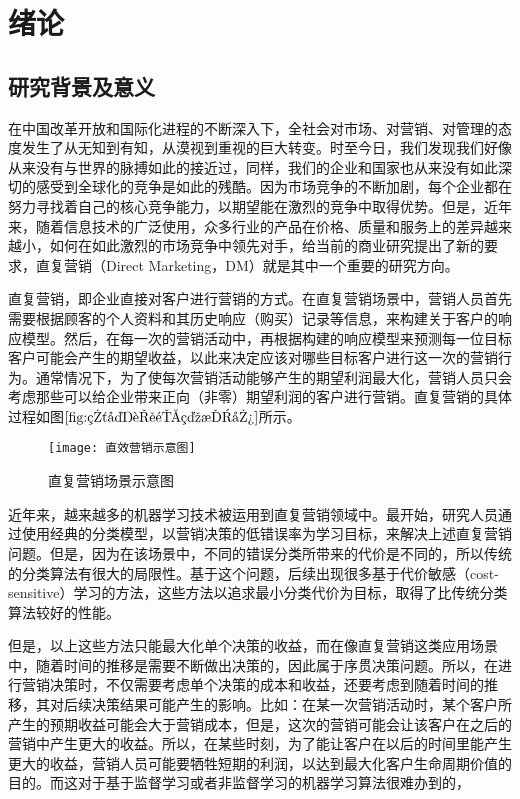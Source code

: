 \chapter{绪论}
 

 \section{研究背景及意义}
 在中国改革开放和国际化进程的不断深入下，全社会对市场、对营销、对管理的态度发生了从无知到有知，从漠视到重视的巨大转变。时至今日，我们发现我们好像从来没有与世界的脉搏如此的接近过，同样，我们的企业和国家也从来没有如此深切的感受到全球化的竞争是如此的残酷。因为市场竞争的不断加剧，每个企业都在努力寻找着自己的核心竞争能力，以期望能在激烈的竞争中取得优势。但是，近年来，随着信息技术的广泛使用，众多行业的产品在价格、质量和服务上的差异越来越小，如何在如此激烈的市场竞争中领先对手，给当前的商业研究提出了新的要求，直复营销（Direct Marketing，DM）就是其中一个重要的研究方向。

 直复营销，即企业直接对客户进行营销的方式。在直复营销场景中，营销人员首先需要根据顾客的个人资料和其历史响应（购买）记录等信息，来构建关于客户的响应模型。然后，在每一次的营销活动中，再根据构建的响应模型来预测每一位目标客户可能会产生的期望收益，以此来决定应该对哪些目标客户进行这一次的营销行为。通常情况下，为了使每次营销活动能够产生的期望利润最大化，营销人员只会考虑那些可以给企业带来正向（非零）期望利润的客户进行营销\citep{王广宇2013客户关系管理}。直复营销的具体过程如图$\ref{fig:直复营销示意图}$所示。
	\begin{figure}[htbp]
	\centering
	\texttt{[image: 直效营销示意图]}
	\caption{直复营销场景示意图}
	\label{fig:直复营销示意图}
	\end{figure}

近年来，越来越多的机器学习技术被运用到直复营销领域中。最开始，研究人员通过使用经典的分类模型，以营销决策的低错误率为学习目标，来解决上述直复营销问题。但是，因为在该场景中，不同的错误分类所带来的代价是不同的，所以传统的分类算法有很大的局限性。基于这个问题，后续出现很多基于代价敏感（cost-sensitive）学习的方法，这些方法以追求最小分类代价为目标，取得了比传统分类算法较好的性能。

但是，以上这些方法只能最大化单个决策的收益，而在像直复营销这类应用场景中，随着时间的推移是需要不断做出决策的，因此属于序贯决策问题。所以，在进行营销决策时，不仅需要考虑单个决策的成本和收益，还要考虑到随着时间的推移，其对后续决策结果可能产生的影响。比如：在某一次营销活动时，某个客户所产生的预期收益可能会大于营销成本，但是，这次的营销可能会让该客户在之后的营销中产生更大的收益。所以，在某些时刻，为了能让客户在以后的时间里能产生更大的收益，营销人员可能要牺牲短期的利润，以达到最大化客户生命周期价值的目的。而这对于基于监督学习或者非监督学习的机器学习算法很难办到的，

